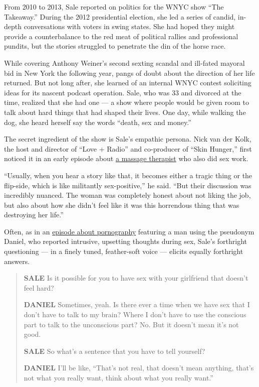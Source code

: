 From 2010 to 2013, Sale reported on politics for the WNYC show ``The
Takeaway.'' During the 2012 presidential election, she led a series of
candid, in-depth conversations with voters in swing states. She had
hoped they might provide a counterbalance to the red meat of political
rallies and professional pundits, but the stories struggled to penetrate
the din of the horse race.

While covering Anthony Weiner's second sexting scandal and ill-fated
mayoral bid in New York the following year, pangs of doubt about the
direction of her life returned. But not long after, she learned of an
internal WNYC contest soliciting ideas for its nascent podcast
operation. Sale, who was 33 and divorced at the time, realized that she
had one --- a show where people would be given room to talk about hard
things that had shaped their lives. One day, while walking the dog, she
heard herself say the words ``death, sex and money.''

The secret ingredient of the show is Sale's empathic persona. Nick van
der Kolk, the host and director of ``Love + Radio'' and co-producer of
``Skin Hunger,'' first noticed it in an early episode about
\href{https://www.wnycstudios.org/podcasts/deathsexmoney/episodes/sex-worker-next-door}{a
massage therapist} who also did sex work.

``Usually, when you hear a story like that, it becomes either a tragic
thing or the flip-side, which is like militantly sex-positive,'' he
said. ``But their discussion was incredibly nuanced. The woman was
completely honest about not liking the job, but also about how she
didn't feel like it was this horrendous thing that was destroying her
life.''

Often, as in an
\href{https://www.wnycstudios.org/podcasts/deathsexmoney/episodes/porn-death-sex-money}{episode
about pornography} featuring a man using the pseudonym Daniel, who
reported intrusive, upsetting thoughts during sex, Sale's forthright
questioning --- in a finely tuned, feather-soft voice --- elicits
equally forthright answers.

\begin{quote}
\textbf{SALE} Is it possible for you to have sex with your girlfriend
that doesn't feel hard?

\textbf{DANIEL} Sometimes, yeah. Is there ever a time when we have sex
that I don't have to talk to my brain? Where I don't have to use the
conscious part to talk to the unconscious part? No. But it doesn't mean
it's not good.

\textbf{SALE} So what's a sentence that you have to tell yourself?

\textbf{DANIEL} I'll be like, ``That's not real, that doesn't mean
anything, that's not what you really want, think about what you really
want.''
\end{quote}

